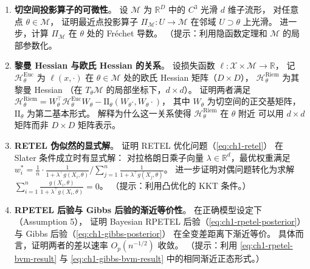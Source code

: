 \begin{enumerate}

    \item\textbf{切空间投影算子的可微性}。
          设 $\mathcal{M}$ 为 $\mathbb{R}^D$ 中的 $C^3$ 光滑 $d$ 维子流形，
          对任意点 $\theta\in\mathcal{M}$，
          证明最近点投影算子 $\Pi_{\mathcal{M}}:U\to\mathcal{M}$
          在邻域 $U\supset\theta$ 上光滑。
          进一步，计算 $\Pi_{\mathcal{M}}$ 在 $\theta$ 处的 Fréchet 导数。
          （提示：利用隐函数定理和 $\mathcal{M}$ 的局部参数化。

    \item\textbf{黎曼 Hessian 与欧氏 Hessian 的关系}。
          设损失函数 $\ell:\mathcal{X}\times\mathcal{M}\to\mathbb{R}$，
          记 $\mathcal{H}_\theta^{\mathrm{Euc}}$ 为 $\ell(x,\cdot)$ 在 $\theta\in\mathcal{M}$
          处的欧氏 Hessian 矩阵（$D\times D$），
          $\mathcal{H}_\theta^{\mathrm{Riem}}$ 为其黎曼 Hessian
          （在 $T_\theta\mathcal{M}$ 的局部坐标下，$d\times d$）。
          证明两者满足
          $\mathcal{H}_\theta^{\mathrm{Riem}}
           = W_\theta^\top \mathcal{H}_\theta^{\mathrm{Euc}} W_\theta
             - \mathrm{II}_\theta(W_\theta\cdot,W_\theta\cdot)$，
          其中 $W_\theta$ 为切空间的正交基矩阵，
          $\mathrm{II}_\theta$ 为第二基本形式。
          解释为什么这一关系使得 $\mathcal{H}_\theta^{\mathrm{Riem}}$ 在 $\theta$ 附近
          可以用 $d\times d$ 矩阵而非 $D\times D$ 矩阵表示。

    \item\textbf{RETEL 伪似然的显式解}。
          证明 RETEL 优化问题（\cref{eq:ch1-retel}）
          在 Slater 条件成立时有显式解：
          对拉格朗日乘子向量 $\lambda\in\mathbb{R}^d$，最优权重满足
          $w_i^* = \frac{1}{n}\cdot\frac{1}{1+\lambda^\top g(X_i,\theta)}
                    \bigg/\sum_{j=1}^n\frac{1}{1+\lambda^\top g(X_j,\theta)}$。
          进一步证明对偶问题转化为求解
          $\sum_{i=1}^n\frac{g(X_i,\theta)}{1+\lambda^\top g(X_i,\theta)}=0$。
          （提示：利用凸优化的 KKT 条件。）

    \item\textbf{RPETEL 后验与 Gibbs 后验的渐近等价性}。
          在正确模型设定下（Assumption 5），
          证明 Bayesian RPETEL 后验（\cref{eq:ch1-rpetel-posterior}）
          与 Gibbs 后验（\cref{eq:ch1-gibbs-posterior}）
          在全变差距离下渐近等价。
          具体而言，证明两者的差以速率 $O_p(n^{-1/2})$ 收敛。
          （提示：利用 \cref{eq:ch1-rpetel-bvm-result} 与
          \cref{eq:ch1-gibbs-bvm-result} 中的相同渐近正态形式。）


\end{enumerate}
